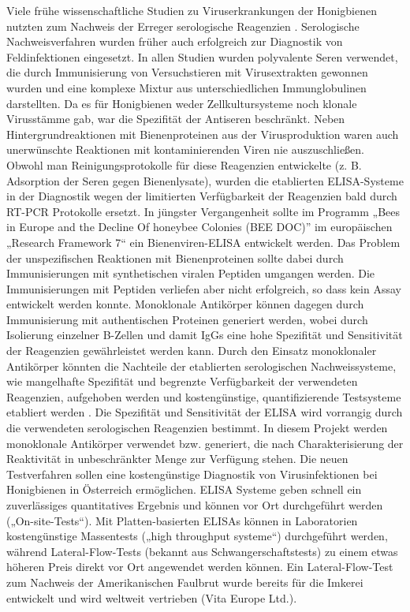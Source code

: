 Viele frühe wissenschaftliche Studien zu Viruserkrankungen der Honigbienen nutzten zum Nachweis der Erreger serologische Reagenzien \citep{Anderson1984}. Serologische Nachweisverfahren wurden früher auch erfolgreich zur Diagnostik von Feldinfektionen eingesetzt. In allen Studien wurden polyvalente Seren verwendet, die durch Immunisierung von Versuchstieren mit Virusextrakten gewonnen wurden und eine komplexe Mixtur aus unterschiedlichen Immunglobulinen darstellten. Da es für Honigbienen weder Zellkultursysteme noch klonale Virusstämme gab, war die Spezifität der Antiseren beschränkt. Neben Hintergrundreaktionen mit Bienenproteinen aus der Virusproduktion waren auch unerwünschte Reaktionen mit kontaminierenden Viren nie auszuschließen. Obwohl man Reinigungsprotokolle für diese Reagenzien entwickelte (z. B. Adsorption der Seren gegen Bienenlysate), wurden die etablierten ELISA-Systeme in der Diagnostik wegen der limitierten Verfügbarkeit der Reagenzien bald durch RT-PCR Protokolle ersetzt. In jüngster Vergangenheit sollte im Programm „Bees in Europe and the Decline Of honeybee Colonies (BEE DOC)” im europäischen „Research Framework 7“ ein Bienenviren-ELISA entwickelt werden. Das Problem der unspezifischen Reaktionen mit Bienenproteinen sollte dabei durch Immunisierungen mit synthetischen viralen Peptiden umgangen werden. Die Immunisierungen mit Peptiden verliefen aber nicht erfolgreich, so dass kein Assay entwickelt werden konnte. Monoklonale Antikörper können dagegen durch Immunisierung mit authentischen Proteinen generiert werden, wobei durch Isolierung einzelner B-Zellen und damit IgGs eine hohe Spezifität und Sensitivität der Reagenzien gewährleistet werden kann. Durch den Einsatz monoklonaler Antikörper könnten die Nachteile der etablierten serologischen Nachweissysteme, wie mangelhafte Spezifität und begrenzte Verfügbarkeit der verwendeten Reagenzien, aufgehoben werden und kostengünstige, quantifizierende Testsysteme etabliert werden \citep{Usuda1999}.
Die Spezifität und Sensitivität der ELISA wird vorrangig durch die verwendeten serologischen Reagenzien bestimmt. In diesem Projekt werden monoklonale Antikörper verwendet bzw. generiert, die nach Charakterisierung der Reaktivität in unbeschränkter Menge zur Verfügung stehen. Die neuen Testverfahren sollen eine kostengünstige Diagnostik von Virusinfektionen bei Honigbienen in Österreich ermöglichen. ELISA Systeme geben schnell ein zuverlässiges quantitatives Ergebnis und können vor Ort durchgeführt werden („On-site-Tests“). Mit Platten-basierten ELISAs können in Laboratorien kostengünstige Massentests („high throughput systeme“) durchgeführt werden, während Lateral-Flow-Tests (bekannt aus Schwangerschaftstests) zu einem etwas höheren Preis direkt vor Ort angewendet werden können. Ein Lateral-Flow-Test zum Nachweis der Amerikanischen Faulbrut wurde bereits für die Imkerei entwickelt und wird weltweit vertrieben (Vita Europe Ltd.).




